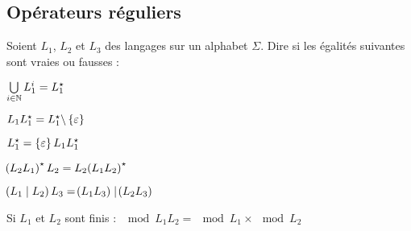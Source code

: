 \documentclass[a4paper,french,bookmarks]{book}
\begin{document}
    \subsection{Opérateurs réguliers}
    
    Soient $L_1$, $L_2$ et $L_3$ des langages sur un alphabet $\Sigma$. Dire si les égalités suivantes sont vraies ou fausses :
    
    \begin{enumerate}
        \begin{minipage}{0.45\linewidth}
            \item $\bigcup\limits_{i \in \mathbb{N}} L_1^i = L_1^\star$
            
            
            \item $L_1L_1^\star = L_1^\star \backslash \left\{\varepsilon\right\}$
            
            
            \item $L_1^\star = \left\{\varepsilon\right\} L_1L_1^\star$
            
        \end{minipage}
        \hfill
        \begin{minipage}{0.45\linewidth}
            \item $\!\left(L_2L_1\right)^\star L_2 = L_2\!\left(L_1L_2\right)^\star$
            
            
            \item $\!\left(L_1 \mid L_2\right)L_3 = \!\left(L_1L_3\right) \mid \!\left(L_2L_3\right)$
            
            
            \item Si $L_1$ et $L_2$ sont finis : $\mod{L_1L_2} = \mod{L_1}\times\mod{L_2}$
            
        \end{minipage}
    \end{enumerate}
    
\end{document}
